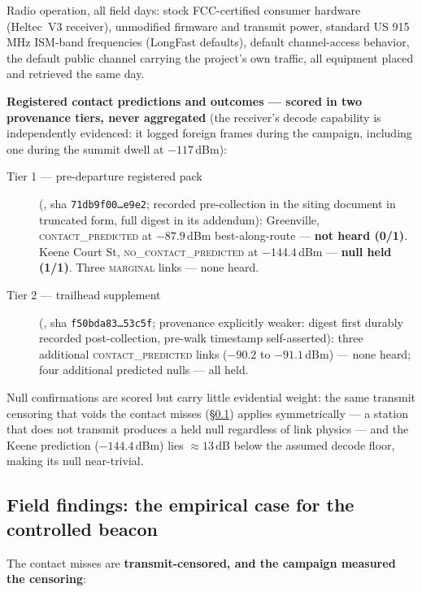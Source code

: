 \documentclass[11pt]{article}
\newcommand{\code}[1]{\texttt{\small #1}}
\begin{document}
Radio operation, all field days: stock FCC-certified consumer hardware
(Heltec~V3 receiver), unmodified firmware and transmit power, standard US
915\,MHz ISM-band frequencies (LongFast defaults), default channel-access
behavior, the default public channel carrying the project's own traffic, all
equipment placed and retrieved the same day.

\textbf{Registered contact predictions and outcomes --- scored in two
provenance tiers, never aggregated} (the receiver's decode capability is
independently evidenced: it logged foreign frames during the campaign,
including one during the summit dwell at $-117$\,dBm):

\begin{description}
\item[Tier 1 --- pre-departure registered pack]
(, sha
\code{71db9f00\ldots e9e2}; recorded pre-collection in the siting document in
truncated form, full digest in its addendum): Greenville,
\textsc{contact\_predicted} at $-87.9$\,dBm best-along-route --- \textbf{not
heard (0/1)}. Keene Court St, \textsc{no\_contact\_predicted} at
$-144.4$\,dBm --- \textbf{null held (1/1)}. Three \textsc{marginal} links ---
none heard.
\item[Tier 2 --- trailhead supplement]
(, sha
\code{f50bda83\ldots 53c5f}; provenance explicitly weaker: digest first
durably recorded post-collection, pre-walk timestamp self-asserted): three
additional \textsc{contact\_predicted} links ($-90.2$ to $-91.1$\,dBm) ---
none heard; four
additional predicted nulls --- all held.
\end{description}

Null confirmations are scored but carry little evidential weight: the same
transmit censoring that voids the contact misses (\S\ref{sec:fieldfindings})
applies symmetrically --- a station that does not transmit produces a held
null regardless of link physics --- and the Keene prediction ($-144.4$\,dBm)
lies ${\approx}13$\,dB below the assumed decode floor, making its null
near-trivial.

\subsection{Field findings: the empirical case for the controlled beacon}\label{sec:fieldfindings}

The contact misses are \textbf{transmit-censored, and the campaign measured
the censoring}:
\end{document}
